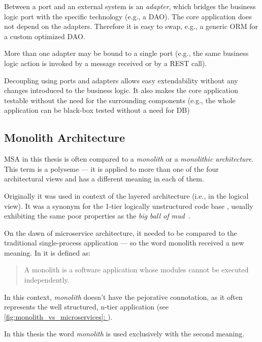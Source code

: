 \documentclass[thesis=M,english,hidelinks]{FITthesis}[2012/10/20]
\newcommand*{\fullref}[1]{\hyperref[{#1}]{\autoref*{#1}: \textit{\nameref*{#1}}}}
\begin{document}
Between a port and an external system is an \textit{adapter}, which bridges the business logic port with the specific technology (e.g., a \acrlong{DAO}). The core application does not depend on the adapters. Therefore it is easy to swap, e.g., a generic \acrshort{ORM} for a custom optimized \acrshort{DAO}.

More than one adapter may be bound to a single port (e.g., the same business logic action is invoked by a message received or by a \acrshort{REST} call).

Decoupling using ports and adapters allows easy extendability without any changes introduced to the business logic. It also makes the core application testable without the need for the surrounding components (e.g., the whole application can be black-box tested without a need for \acrshort{DB})

\subsection{Monolith Architecture}

\acrshort{MSA} in this thesis is often compared to a \textit{monolith} or a \textit{monolithic architecture}. This term is a polyseme --- it is applied to more than one of the four architectural views and has a different meaning in each of them.

Originally it was used in context of the layered architecture (i.e., in the logical view). It was a synonym for the 1-tier logically unstructured code base \cite{professional-asp, wiki-monolith}, usually exhibiting the same poor properties as the \textit{big ball of mud}~\cite{big-ball-mud}.

On the dawn of microservice architecture, it needed to be compared to the traditional single-process application --- so the word monolith received a new meaning. In \cite{ms-today-tomorrow} it is defined as:

\begin{quote}
    A monolith is a software application whose modules cannot be executed independently.
\end{quote}

In this context, \textit{monolith} doesn't have the pejorative connotation, as it often represents the well structured, n-tier application (see \fullref{fig:monolith_vs_microservices}).

In this thesis the word \textit{monolith} is used exclusively with the second meaning.

% 
% 
\end{document}
